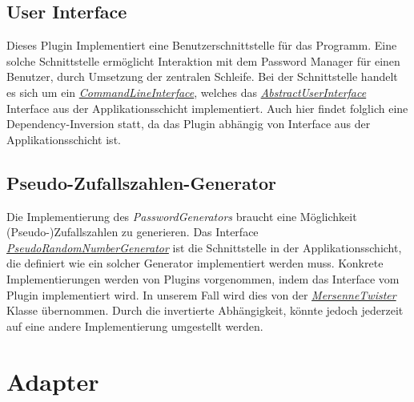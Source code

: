 \subsection{User Interface}

Dieses Plugin Implementiert eine Benutzerschnittstelle für das Programm. Eine solche Schnittstelle ermöglicht Interaktion mit dem Password Manager für einen Benutzer, durch Umsetzung der zentralen Schleife. Bei der Schnittstelle handelt es sich um ein \href{https://github.com/moorts/Morik/blob/main/src/plugins/ui/CommandLineInterface.h}{\textit{CommandLineInterface}}, welches das \href{https://github.com/moorts/Morik/blob/main/src/application/AbstractUserInterface.h}{\textit{AbstractUserInterface}} Interface aus der Applikationsschicht implementiert. Auch hier findet folglich eine Dependency-Inversion statt, da das Plugin abhängig von Interface aus der Applikationsschicht ist.

\subsection{Pseudo-Zufallszahlen-Generator}

Die Implementierung des \textit{PasswordGenerators} braucht eine Möglichkeit (Pseudo-)Zufallszahlen zu generieren. Das Interface \href{https://github.com/moorts/Morik/blob/main/src/application/PseudoRandomNumberGenerator.h}{\textit{PseudoRandomNumberGenerator}} ist die Schnittstelle in der Applikationsschicht, die definiert wie ein solcher Generator implementiert werden muss. Konkrete Implementierungen werden von Plugins vorgenommen, indem das Interface vom Plugin implementiert wird. In unserem Fall wird dies von der \href{https://github.com/moorts/Morik/blob/main/src/plugins/prng/MersenneTwister.h}{\textit{MersenneTwister}} Klasse übernommen. Durch die invertierte Abhängigkeit, könnte jedoch jederzeit auf eine andere Implementierung umgestellt werden.

\section{Adapter}
